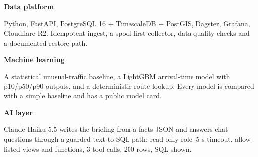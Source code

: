 \documentclass[10.5pt]{article}
\begin{document}
\vspace{5pt}

\begin{minipage}[t]{0.32\linewidth}
\begin{softcard}
{\bfseries Data platform}

\vspace{2pt}
{\footnotesize Python, FastAPI, PostgreSQL 16 + TimescaleDB + PostGIS, Dagster, Grafana, Cloudflare R2. Idempotent ingest, a spool-first collector, data-quality checks and a documented restore path.}
\end{softcard}
\end{minipage}\hfill
\begin{minipage}[t]{0.32\linewidth}
\begin{softcard}
{\bfseries Machine learning}

\vspace{2pt}
{\footnotesize A statistical unusual-traffic baseline, a LightGBM arrival-time model with p10/p50/p90 outputs, and a deterministic route lookup. Every model is compared with a simple baseline and has a public model card.}
\end{softcard}
\end{minipage}\hfill
\begin{minipage}[t]{0.32\linewidth}
\begin{softcard}
{\bfseries AI layer}

\vspace{2pt}
{\footnotesize Claude Haiku 5.5 writes the briefing from a facts JSON and answers chat questions through a guarded text-to-SQL path: read-only role, 5 s timeout, allow-listed views and functions, 3 tool calls, 200 rows, SQL shown.}
\end{softcard}
\end{minipage}
\end{document}
